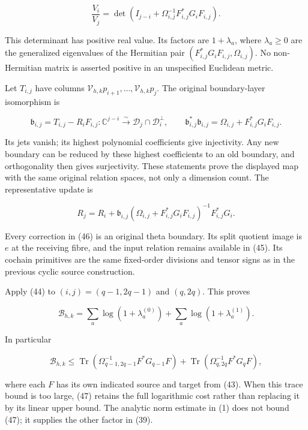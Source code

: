\[
 \boxed{\frac{V_i}{V_j}
 =\det\!\left(I_{j-i}+\Omega_{i,j}^{-1}F_{i,j}^*G_iF_{i,j}\right).}       \tag{44}
\]

This determinant has positive real value. Its factors are
\(1+\lambda_a\), where \(\lambda_a\ge0\) are the generalized eigenvalues
of the Hermitian pair \((F_{i,j}^*G_iF_{i,j},\Omega_{i,j})\). No
non-Hermitian matrix is asserted positive in an unspecified Euclidean
metric.

Let \(T_{i,j}\) have columns \(\mathcal V_{h,k}p_{i+1},\ldots,
\mathcal V_{h,k}p_j\). The original boundary-layer isomorphism is

\[
 \mathfrak b_{i,j}=T_{i,j}-R_iF_{i,j}:
 \mathbb{C}^{j-i}\xrightarrow{\sim}
 \mathcal D_j\cap\mathcal D_i^\perp,
 \qquad
 \mathfrak b_{i,j}^*\mathfrak b_{i,j}
 =\Omega_{i,j}+F_{i,j}^*G_iF_{i,j}.                                     \tag{45}
\]

Its jets vanish; its highest polynomial coefficients give injectivity.
Any new boundary can be reduced by these highest coefficients to an old
boundary, and orthogonality then gives surjectivity. These statements
prove the displayed map with the same original relation spaces, not only
a dimension count. The representative update is

\[
 R_j=R_i+
 \mathfrak b_{i,j}
 (\Omega_{i,j}+F_{i,j}^*G_iF_{i,j})^{-1}F_{i,j}^*G_i.                    \tag{46}
\]

Every correction in (46) is an original theta boundary. Its split
quotient image is \(e\) at the receiving fibre, and the input relation
remains available in (45). Its cochain primitives are the same
fixed-order divisions and tensor signs as in the previous cyclic source
construction.

Apply (44) to \((i,j)=(q-1,2q-1)\) and \((q,2q)\). This proves

\[
 \boxed{\mathcal B_{h,k}
 =\sum_a\log(1+\lambda_a^{(0)})
   +\sum_a\log(1+\lambda_a^{(1)}).}                                    \tag{47}
\]

In particular

\[
 \mathcal B_{h,k}\le
 \operatorname{Tr}(\Omega_{q-1,2q-1}^{-1}F^*G_{q-1}F)
 +\operatorname{Tr}(\Omega_{q,2q}^{-1}F^*G_qF),                          \tag{48}
\]

where each \(F\) has its own indicated source and target from (43). When
this trace bound is too large, (47) retains the full logarithmic cost
rather than replacing it by its linear upper bound. The analytic norm
estimate in (1) does not bound (47); it supplies the other factor in
(39).


